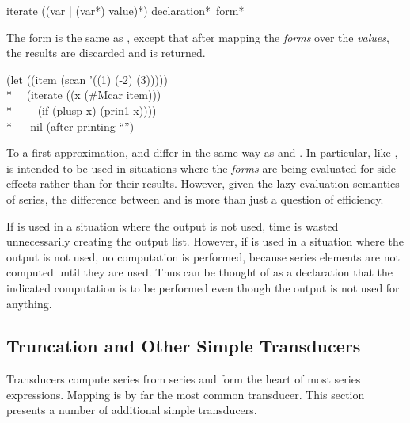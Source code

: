 \begin{defmac}
iterate ({({var | ({var}*)} value)}*) {declaration}* {\,form}*

The form  is the same as , except that after
mapping the \emph{forms} over the \emph{values}, the results are discarded and
 is returned.
\begin{lisp}
(let ((item (scan '((1) (-2) (3))))) \\*
~~(iterate ((x (\#Mcar item))) \\*
~~~~(if (plusp x) (prin1 x)))) \\*
~~{\EV} nil {\rm (after printing ``'')}
\end{lisp}

To a first approximation,  and  differ in the same
way as  and .  In particular, like ,
 is intended to be used in situations where the \emph{forms} are
being evaluated for side effects rather than for their results.  However, given
the lazy evaluation semantics of series, the difference between
 and  is more than just a question of efficiency.

If  is used in a situation where the output is not used, time is
wasted unnecessarily creating the output list.  However, if  is
used in a situation where the output is not used, no computation is
performed, because series elements are not computed until they are used.
Thus  can be thought of as a declaration that the indicated
computation is to be performed even though the output is not used for
anything.
\end{defmac}

\subsection{Truncation and Other Simple Transducers}

Transducers compute series from series and form the heart of most series
expressions.  Mapping is by far the most common transducer.   This section
presents a number of additional simple transducers.


